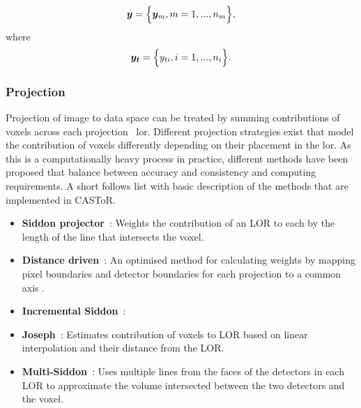\begin{equation}
   \bm{y} = \Big\{ {\bm{y}_m,m=1,...,n_m} \Big\} \\,
\end{equation}
where
\begin{equation}
   \bm{y_t} = \Big\{ {y_{ti},i=1,...,n_i} \Big\} \\.
\end{equation}


\subsubsection{Projection}
Projection of image to data space can be treated by summing contributions of voxels across each projection ~\gls{lor}. Different projection strategies exist that model the contribution of voxels differently depending on their placement in the \gls{lor}. As this is a computationally heavy process in practice, different methods have been proposed that balance between accuracy and consistency and computing requirements. A short follows list with basic description of the methods that are implemented in CASToR.

\begin{itemize}
\item  \textbf{Siddon projector}~\cite{Siddon1985}: Weights the contribution of an LOR to each by the length of the line that intersects the voxel.
\item  \textbf{Distance driven}~\cite{DeMan2004}: An optimised method for calculating weights by mapping pixel boundaries and detector boundaries for each projection to a common axis .
\item  \textbf{Incremental Siddon}~\cite{Jacobs2015}:
\item  \textbf{Joseph}~\cite{Joseph1982}: Estimates contribution of voxels to LOR based on linear interpolation and their distance from the LOR. 
\item  \textbf{Multi-Siddon}~\cite{Moehrs2008}: Uses multiple lines from the faces of the detectors in each LOR to approximate the volume intersected between the two detectors and the voxel.
\end{itemize}

